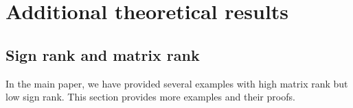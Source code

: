 \documentclass[11pt]{article}
\theoremstyle{plain}
\theoremstyle{definition}
\begin{document}

\tableofcontents


\clearpage
\section{Additional theoretical results}\label{sec:additional}
\subsection{Sign rank and matrix rank}\label{sec:signrank}

In the main paper, we have provided several examples with high matrix rank but low sign rank. This section provides more examples and their proofs. 
\end{document}
